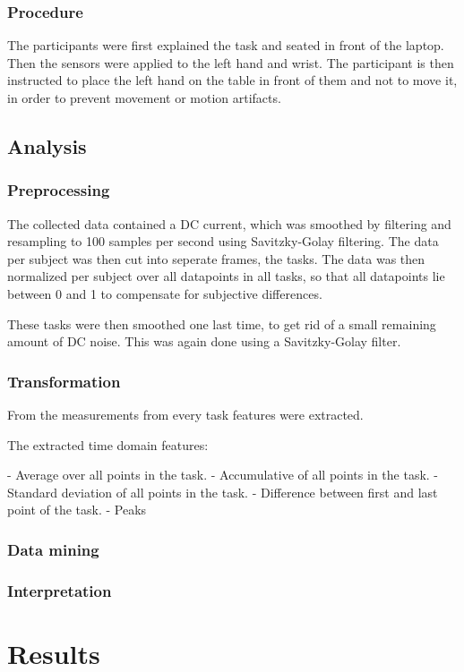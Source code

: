 \documentclass[12pt,fleqn,leqno,letterpaper]{article}
\begin{document}
\subsubsection{Procedure}
The participants were first explained the task and seated in front of the laptop. Then the sensors were applied to the left hand and wrist. The participant is then instructed to place the left hand on the table in front of them and not to move it, in order to prevent movement or motion artifacts.

\subsection{Analysis}
\subsubsection{Preprocessing}
The collected data contained a DC current, which was smoothed by filtering and resampling to 100 samples per second using Savitzky-Golay filtering. 
The data per subject was then cut into seperate frames, the tasks. The data was then normalized per subject over all datapoints in all tasks, so that all datapoints lie between 0 and 1 to compensate for subjective differences.

These tasks were then smoothed one last time, to get rid of a small remaining amount of DC noise. This was again done using a Savitzky-Golay filter.

\subsubsection{Transformation}
From the measurements from every task features were extracted. 

The extracted time domain features:

- Average over all points in the task.
- Accumulative of all points in the task.
- Standard deviation of all points in the task.
- Difference between first and last point of the task.
- Peaks


\subsubsection{Data mining}
\subsubsection{Interpretation}

\section{Results}
\end{document}
